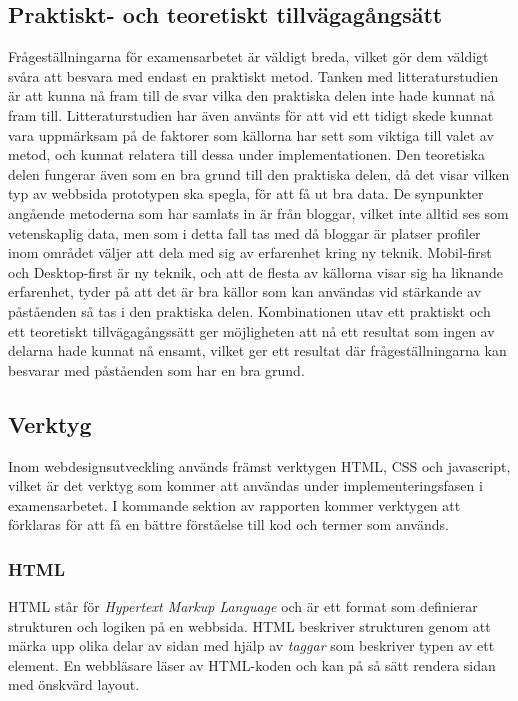 \documentclass[11pt]{article}
\begin{document}
\subsection{Praktiskt- och teoretiskt tillvägagångsätt}
Frågeställningarna för examensarbetet är väldigt breda, vilket gör dem väldigt svåra att besvara med endast en praktiskt metod. Tanken med litteraturstudien är att kunna nå fram till de svar vilka den praktiska delen inte hade kunnat nå fram till. Litteraturstudien har även använts för att vid ett tidigt skede kunnat vara uppmärksam på de faktorer som källorna har sett som viktiga till valet av metod, och kunnat relatera till dessa under implementationen. Den teoretiska delen fungerar även som en bra grund till den praktiska delen, då det visar vilken typ av webbsida prototypen ska spegla, för att få ut bra data. De synpunkter angående metoderna som har samlats in är från bloggar, vilket inte alltid ses som vetenskaplig data, men som i detta fall tas med då bloggar är platser profiler inom området väljer att dela med sig av erfarenhet kring ny teknik. Mobil-first och Desktop-first är ny teknik, och att de flesta av källorna visar sig ha liknande erfarenhet, tyder på att det är bra källor som kan användas vid stärkande av påståenden så tas i den praktiska delen. Kombinationen utav ett praktiskt och ett teoretiskt tillvägagångssätt ger möjligheten att nå ett resultat som ingen av delarna hade kunnat nå ensamt, vilket ger ett resultat där frågeställningarna kan besvarar med påståenden som har en bra grund.



\subsection{Verktyg}

Inom webdesignsutveckling används främst verktygen HTML, CSS och javascript, vilket är det verktyg som kommer att användas under implementeringsfasen i examensarbetet.  I kommande sektion av rapporten kommer verktygen att förklaras för att få en bättre förståelse till kod och termer som används.

\subsubsection{HTML}
HTML står för \textit{Hypertext Markup Language} och är ett format som definierar strukturen och logiken på en webbsida. HTML beskriver strukturen genom att märka upp olika delar av sidan med hjälp av \textit{taggar} som beskriver typen av ett element. En webbläsare läser av HTML-koden och kan på så sätt rendera sidan med önskvärd layout.
\end{document}
